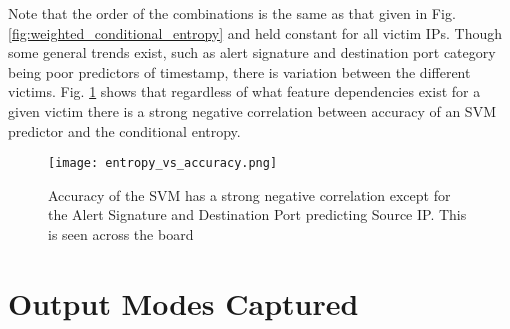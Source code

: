 Note that the order of the combinations is the same as that given in Fig. \ref{fig:weighted_conditional_entropy} and held constant for all victim IPs. Though some general trends exist, such as alert signature and destination port category being poor predictors of timestamp, there is variation between the different victims. Fig. \ref{fig:entropy_v_accuracy} shows that regardless of what feature dependencies exist for a given victim there is a strong negative correlation between accuracy of an SVM predictor and the conditional entropy.

\begin{figure}[!htbp]
	\centering
	\texttt{[image: entropy\_vs\_accuracy.png]}
	\caption{Accuracy of the SVM has a strong negative correlation except for the Alert Signature and Destination Port predicting Source IP. This is seen across the board \vspace*{-10pt}}
	\label{fig:entropy_v_accuracy}
\end{figure}

\section{Output Modes Captured}
\label{sec:output}


